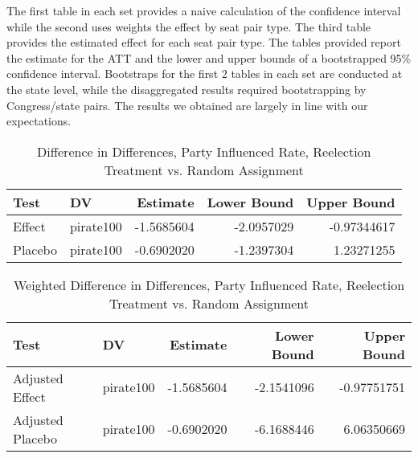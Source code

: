 \documentclass[12pt]{article}
\begin{document}
The first table in each set provides a naive calculation of the confidence interval while the second uses weights the effect by seat pair type. The third table provides the estimated effect for each seat pair type. The tables provided report the estimate for the ATT and the lower and upper bounds of a bootstrapped 95\% confidence interval. Bootstraps for the first 2 tables in each set are conducted at the state level, while the disaggregated results required bootstrapping by Congress/state pairs. The results we obtained are largely in line with our expectations.

\pagebreak

\begin{table}[H]
	\centering
	\caption{Difference in Differences, Party Influenced Rate, Reelection Treatment vs. Random Assignment}
	\begin{tabular}{llrrr}
		\hline
		Test & DV & Estimate & Lower Bound & Upper Bound \\ 
		\hline
		Effect & pirate100 & -1.5685604 & -2.0957029 & -0.97344617 \\ 
		Placebo & pirate100 & -0.6902020 & -1.2397304 & 1.23271255 \\ 
		\hline
	\end{tabular}
\end{table}

\begin{table}[H]
	\centering
	\caption{Weighted Difference in Differences, Party Influenced Rate, Reelection Treatment vs. Random Assignment}
	\begin{tabular}{llrrr}
		\hline
		Test & DV & Estimate & Lower Bound & Upper Bound \\  
		\hline
		Adjusted Effect & pirate100 & -1.5685604 & -2.1541096 & -0.97751751 \\ 
		Adjusted Placebo & pirate100 & -0.6902020 & -6.1688446 & 6.06350669 \\ 
		\hline
	\end{tabular}
\end{table}
\end{document}
